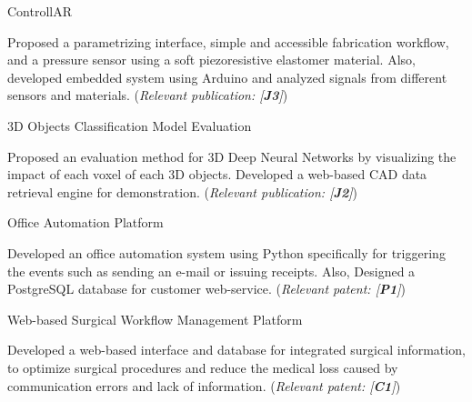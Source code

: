 \begin{cventries}

\cvpub
{ControllAR} %
{ %
\begin{cvitems}
\item {Proposed a parametrizing interface, simple and accessible fabrication workflow, and a pressure sensor using a soft piezoresistive elastomer material. Also, developed embedded system using Arduino and analyzed signals from different sensors and materials. (\textit{Relevant publication: [\textbf{J3}]})}
\end{cvitems}
}

\cvpub
{3D Objects Classification Model Evaluation} %
{ %
\begin{cvitems}
\item {Proposed an evaluation method for 3D Deep Neural Networks by visualizing the impact of each voxel of each 3D objects. Developed a web-based CAD data retrieval engine for demonstration. (\textit{Relevant publication: [\textbf{J2}]})}
\end{cvitems}
}

\cvpub
{Office Automation Platform} %
{ %
\begin{cvitems}
\item {Developed an office automation system using Python specifically for triggering the events such as sending an e-mail or issuing receipts. Also, Designed a PostgreSQL database for customer web-service. (\textit{Relevant patent: [\textbf{P1}]})}
\end{cvitems}
}

\cvpub
{Web-based Surgical Workflow Management Platform} %
{ %
\begin{cvitems}
\item {Developed a web-based interface and database for integrated surgical information, to optimize surgical procedures and reduce the medical loss caused by communication errors and lack of information. (\textit{Relevant patent: [\textbf{C1}]})}
\end{cvitems}
}

\end{cventries}
